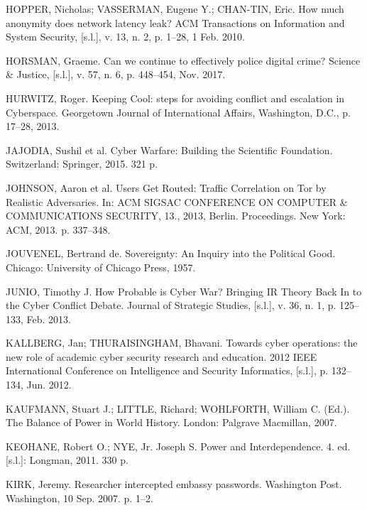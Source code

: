 \begin{list}{}{\setlength{\leftmargin}{0pt}\setlength{\itemsep}{6pt}\setlength{\parsep}{0pt}}
\item HOPPER, Nicholas; VASSERMAN, Eugene Y.; CHAN-TIN, Eric. How much anonymity does network latency leak? ACM Transactions on Information and System Security, [s.l.], v. 13, n. 2, p. 1--28, 1 Feb. 2010.

\item HORSMAN, Graeme. Can we continue to effectively police digital crime? Science \& Justice, [s.l.], v. 57, n. 6, p. 448--454, Nov. 2017.

\item HURWITZ, Roger. Keeping Cool: steps for avoiding conflict and escalation in Cyberspace. Georgetown Journal of International Affairs, Washington, D.C., p. 17--28, 2013.

\item JAJODIA, Sushil et al. Cyber Warfare: Building the Scientific Foundation. Switzerland: Springer, 2015. 321 p.

\item JOHNSON, Aaron et al. Users Get Routed: Traffic Correlation on Tor by Realistic Adversaries. In: ACM SIGSAC CONFERENCE ON COMPUTER \& COMMUNICATIONS SECURITY, 13., 2013, Berlin. Proceedings. New York: ACM, 2013. p. 337--348.

\item JOUVENEL, Bertrand de. Sovereignty: An Inquiry into the Political Good. Chicago: University of Chicago Press, 1957.

\item JUNIO, Timothy J. How Probable is Cyber War? Bringing IR Theory Back In to the Cyber Conflict Debate. Journal of Strategic Studies, [s.l.], v. 36, n. 1, p. 125--133, Feb. 2013.

\item KALLBERG, Jan; THURAISINGHAM, Bhavani. Towards cyber operations: the new role of academic cyber security research and education. 2012 IEEE International Conference on Intelligence and Security Informatics, [s.l.], p. 132--134, Jun. 2012.

\item KAUFMANN, Stuart J.; LITTLE, Richard; WOHLFORTH, William C. (Ed.). The Balance of Power in World History. London: Palgrave Macmillan, 2007.

\item KEOHANE, Robert O.; NYE, Jr. Joseph S. Power and Interdependence. 4. ed. [s.l.]: Longman, 2011. 330 p.

\item KIRK, Jeremy. Researcher intercepted embassy passwords. Washington Post. Washington, 10 Sep. 2007. p. 1--2.


\end{list}
